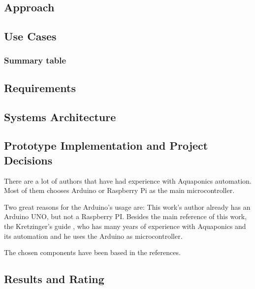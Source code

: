 \subsection{Approach}
\subsection{Use Cases}


\subsubsection{Summary table}


\subsection{Requirements}
\subsection{Systems Architecture}

\subsection{Prototype Implementation and Project Decisions}
There are a lot of authors that have had experience with Aquaponics automation.
Most of them chooses Arduino or Raspberry Pi as the main microcontroller.

Two great reasons for the Arduino's usage are:
This work's author already has an Arduino UNO,
but not a Raspberry PI.
Besides the main reference of this work,
the Kretzinger's guide \cite{Leatherbury2014},
who has many years of experience with Aquaponics and its automation and he uses the Arduino as microcontroller.

The chosen components have been based in the references.

\subsection{Results and Rating}
